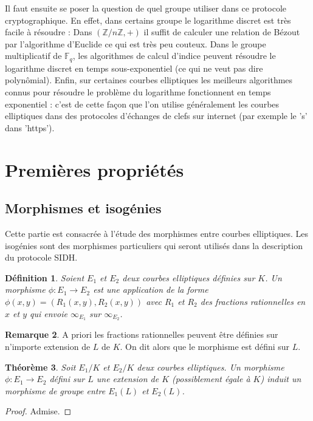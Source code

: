 \documentclass{article}
\theoremstyle{plain}%
\newtheorem{thm}{Théorème}[section]
\newtheorem{deff}[thm]{Définition}
\theoremstyle{definition}%
\newtheorem{rem}[thm]{Remarque}
\newcommand{\F}{\mathbb{F}}
\newcommand{\Z}{\mathbb{Z}}
\begin{document}
Il faut ensuite se poser la question de quel groupe utiliser dans ce protocole cryptographique. En effet, dans certains groupe le logarithme discret est très facile à résoudre : Dans $(\Z/n\Z, +)$ il suffit de calculer une relation de Bézout par l'algorithme d'Euclide ce qui est très peu couteux. Dans le groupe multiplicatif de $\F_q$, les algorithmes de calcul d'indice peuvent résoudre le logarithme discret en temps sous-exponentiel (ce qui ne veut pas dire polynômial). Enfin, sur certaines courbes elliptiques les meilleurs algorithmes connus pour résoudre le problème du logarithme fonctionnent en temps exponentiel : c'est de cette façon que l'on utilise généralement les courbes elliptiques dans des protocoles d'échanges de clefs sur internet (par exemple le 's' dans 'https').


\section{Premières propriétés}


\subsection{Morphismes et isogénies}

Cette partie est consacrée à l'étude des morphismes entre courbes elliptiques. Les isogénies sont des morphismes particuliers qui seront utilisés dans la description du protocole SIDH.
\begin{deff}
  Soient $E_1$ et $E_2$ deux courbes elliptiques définies sur $K$. Un morphisme $\phi : E_1\to  E_2$ est une application de la forme $\phi(x, y) = (R_1(x, y), R_2(x, y))$ avec $R_1$ et $R_2$ des fractions rationnelles en $x$ et $y$ qui envoie $\infty_{E_1}$ sur $\infty_{E_2}$.
\end{deff}

\begin{rem}
  A priori les fractions rationnelles peuvent être définies sur n'importe extension de $L$ de $K$. On dit alors que le morphisme est défini sur $L$.
\end{rem}

\begin{thm}
  Soit $E_1/K$ et $E_2/K$ deux courbes elliptiques. Un morphisme $\phi : E_1\to  E_2$ défini sur $L$ une extension de $K$ (possiblement égale à $K$) induit un morphisme de groupe entre $E_1(L)$ et $E_2(L)$. 
\end{thm}

\begin{proof}
  Admise. 
\end{proof}
\end{document}

